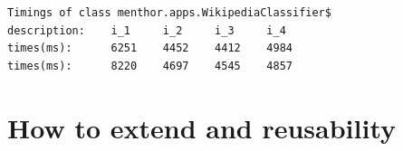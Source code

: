 \documentclass{report}
\begin{document}
\begin{lstlisting}
Timings of class menthor.apps.WikipediaClassifier$
description:    i_1     i_2     i_3     i_4
times(ms):      6251    4452    4412    4984
times(ms):      8220    4697    4545    4857
\end{lstlisting}


\chapter{How to extend and reusability}

{}

\end{document}
